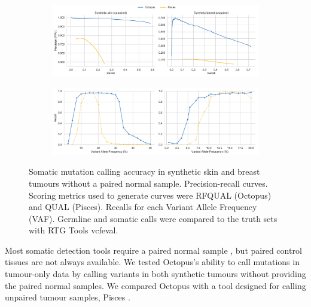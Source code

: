 \documentclass[notitlepage, twocolumn, 10pt]{article}
\begin{document}
\begin{figure}[tp]
    \centering
\captionsetup[subfigure]{position=top,labelfont=bf,textfont=normalfont,singlelinecheck=off,justification=raggedright}
    \begin{subfigure}[b]{\linewidth}
        \vspace{-0.5cm}
        \caption{}
        \includegraphics[width=\linewidth]{figures/tumour-only-precision-recalls}
        \label{fig:to-somatic_pr}
    \end{subfigure}
    \begin{subfigure}[b]{\linewidth}
        \vspace{-0.5cm}
        \caption{}
        \includegraphics[width=\linewidth]{figures/tumour-only-vaf-recalls}
        \label{fig:to-somatic_vaf_recall}
    \end{subfigure}
    \vspace{-1.cm}
    \caption{Somatic mutation calling accuracy in synthetic skin and breast tumours without a paired normal sample. \protect{} Precision-recall curves. Scoring metrics used to generate curves were RFQUAL (Octopus) and QUAL (Pisces). \protect{} Recalls for each Variant Allele Frequency (VAF). Germline and somatic calls were compared to the truth sets with RTG Tools vcfeval.}
    \label{fig:tumour-only-eval}
\end{figure}

Most somatic detection tools require a paired normal sample \cite{RN604, RN601, RN600}, but paired control tissues are not always available. We tested Octopus's ability to call mutations in tumour-only data by calling variants in both synthetic tumours without providing the paired normal samples. We compared Octopus with a tool designed for calling unpaired tumour samples, Pisces \cite{RN602}.
\end{document}
